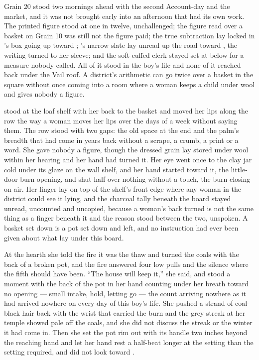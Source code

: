 Grain 20 stood two mornings ahead with the second Account-day and the market, and it was not brought early into an afternoon that had its own work. The printed figure stood at one in twelve, unchallenged; the figure read over a basket on Grain 10 was still not the figure paid; the true subtraction lay locked in 's box going up toward ; 's narrow slate lay unread up the road toward , the writing turned to her sleeve; and the soft-cuffed clerk stayed set at  below  for a measure nobody called. All of it stood in the boy's file and none of it reached back under the Vail roof. A district's arithmetic can go twice over a basket in the square without once coming into a room where a woman keeps a child under wool and gives nobody a figure.

\scenebreak

 stood at the loaf shelf with her back to the basket and moved her lips along the row the way a woman moves her lips over the days of a week without saying them. The row stood with two gaps: the old space at the end and the palm's breadth that had come in years back without a scrape, a crumb, a print or a word. She gave nobody a figure, though the dressed grain lay stored under wool within her hearing and her hand had turned it. Her eye went once to the clay jar cold under its glaze on the wall shelf, and her hand started toward it, the little-door burn opening, and shut half over nothing without a touch, the burn closing on air. Her finger lay on top of the shelf's front edge where any woman in the district could see it lying, and the charcoal tally beneath the board stayed unread, uncounted and uncopied, because a woman's back turned is not the same thing as a finger beneath it and the reason stood between the two, unspoken. A basket set down is a pot set down and left, and no instruction had ever been given about what lay under this board.

At the hearth she told the fire it was the thaw and turned the coals with the back of a broken pot, and the fire answered four low pulls and the silence where the fifth should have been. “The house will keep it,” she said, and stood a moment with the back of the pot in her hand counting under her breath toward no opening --- small intake, hold, letting go --- the count arriving nowhere as it had arrived nowhere on every day of this boy's life. She pushed a strand of coal-black hair back with the wrist that carried the burn and the grey streak at her temple showed pale off the coals, and she did not discuss the streak or the winter it had come in. Then she set the pot rim out with its handle two inches beyond the reaching hand and let her hand rest a half-beat longer at the setting than the setting required, and did not look toward .


